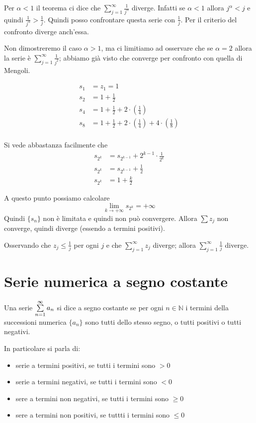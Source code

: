 Per $\alpha < 1$ il teorema ci dice che $\sum_{j=1}^\infty \frac{1}{j^\alpha}$ diverge. Infatti se $\alpha < 1$ allora $j^\alpha < j$ e quindi $\frac{1}{j^\alpha} > \frac{1}{j}$. Quindi posso confrontare questa serie con $\frac{1}{j}$. Per il criterio del confronto diverge anch'essa.

Non dimostreremo il caso $\alpha > 1$, ma ci limitiamo ad osservare che se $\alpha = 2$ allora la serie è $\sum_{j=1}^\infty \frac{1}{j^2}$; abbiamo già visto che converge per confronto con quella di Mengoli.


\begin{align*}
s_1 &= z_1 = 1 \\
s_2 &= 1 + \frac{1}{2} \\
s_4 &= 1 + \frac{1}{2} + 2 \cdot \left(\frac{1}{4}\right) \\
s_8 &= 1 + \frac{1}{2} + 2 \cdot \left(\frac{1}{4}\right) + 4 \cdot \left(\frac{1}{8}\right)\\
\end{align*}

Si vede abbastanza facilmente che
\begin{align*}
s_{2^k} &= s_{2^{k-1}} + 2^{k-1} \cdot \frac{1}{2^k} \\
s_{2^k} &= s_{2^{k-1}} + \frac{1}{2} \\
s_{2^k} &= 1 + \frac{k}{2}
\end{align*}

A questo punto possiamo calcolare 
\begin{equation*}
\lim_{k \to +\infty} s_{2^k} = +\infty
\end{equation*}
Quindi $\{s_n\}$ non è limitata e quindi non può convergere. Allora $\sum z_j$ non converge, quindi diverge (essendo a termini positivi).

Osservando che $z_j \le \frac{1}{j}$ per ogni $j$ e che $\sum_{j=1}^\infty z_j$ diverge; allora $\sum_{j=1}^\infty \frac{1}{j}$ diverge.

\section{Serie numerica a segno costante}

Una serie $\sum\limits_{n=1}^{\infty}a_n$ si dice a segno costante se per ogni $n \in \mathbb{N}$ i termini della successioni numerica $\{a_n\}$ sono tutti dello stesso segno, o tutti positivi o tutti negativi. 

In particolare si parla di:

\begin{itemize}
\item serie a termini positivi, se tutti i termini sono $>0$ 
\item serie a termini negativi, se tutti i termini sono $<0$
\item sere a termini non negativi, se tutti i termini sono $\geq 0$
\item sere a termini non positivi, se tuttti i termini sono $\leq 0$
\end{itemize}



